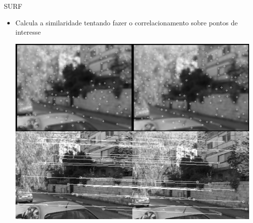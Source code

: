 \documentclass[
    style=paintings,
    paper=screen,
    blackslide,
    nopagebreaks,
    fleqn
]{powerdot}
\begin{document}
\begin{slide}{SURF}
\begin{itemize}[type=1]
\item <1-> Calcula a similaridade tentando fazer o correlacionamento sobre pontos de interesse
\begin{center}
\includegraphics[width=0.65\slidewidth]{img/SURF}
\end{center}
\end{itemize}
\end{slide}
\end{document}
